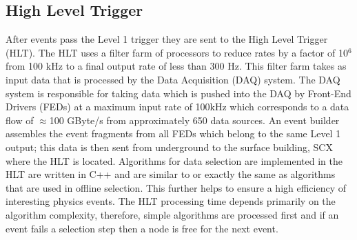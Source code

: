   \subsection{High Level Trigger}
After events pass the Level 1 trigger they are sent to the High Level Trigger (HLT). The
HLT uses a filter farm of processors to reduce rates by a factor of 10$^{6}$ from 
100 kHz to a final output rate of less than 300 Hz. This filter farm takes as input
data that is processed by the Data Acquisition (DAQ) system. The DAQ system is responsible
for taking data which is pushed into the DAQ by Front-End Drivers (FEDs) at a maximum input 
rate of 100kHz which corresponds to a data flow of $\approx$100 GByte/s from approximately
650 data sources. An event builder assembles the event fragments from all FEDs %
which belong to the same Level 1 output; this data is then sent from underground to the surface %
building, SCX where the HLT is located.
Algorithms for data selection are implemented in the HLT are written in
C++ and are similar to or exactly the same as algorithms that are used in offline selection. This 
further helps to ensure a high efficiency of interesting physics events.
The HLT processing time depends primarily on the algorithm complexity,
therefore, simple algorithms are processed first and if an event fails a selection
step then a node is free for the next event.
